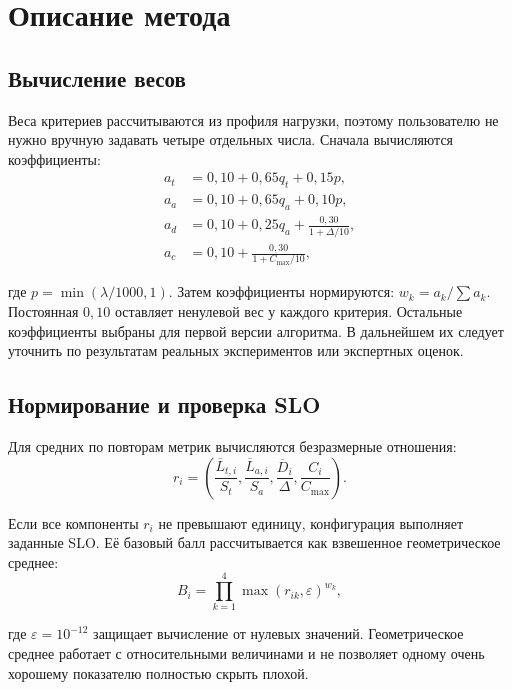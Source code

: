 \documentclass{misisarticle}
\begin{document}
\section{Описание метода}

\subsection{\textnormal{Вычисление весов}}

	Веса критериев рассчитываются из профиля нагрузки, поэтому пользователю не нужно вручную задавать четыре отдельных числа. Сначала вычисляются коэффициенты:
\begin{align}
 a_t &= 0{,}10+0{,}65q_t+0{,}15p,\\
 a_a &= 0{,}10+0{,}65q_a+0{,}10p,\\
 a_d &= 0{,}10+0{,}25q_a+\frac{0{,}30}{1+\Delta/10},\\
 a_c &= 0{,}10+\frac{0{,}30}{1+C_{\max}/10},
 \label{eq:rawweights}
\end{align}

	где $p=\min(\lambda/1000,1)$. Затем коэффициенты нормируются: $w_k=a_k/\sum a_k$. Постоянная $0{,}10$ оставляет ненулевой вес у каждого критерия. Остальные коэффициенты выбраны для первой версии алгоритма. В дальнейшем их следует уточнить по результатам реальных экспериментов или экспертных оценок.

\subsection{\textnormal{Нормирование и проверка SLO}}

	Для средних по повторам метрик вычисляются безразмерные отношения:
\begin{equation}
 r_i=\left(\frac{\overline L_{t,i}}{S_t},
 \frac{\overline L_{a,i}}{S_a},
 \frac{\overline D_i}{\Delta},
 \frac{C_i}{C_{\max}}\right).
 \label{eq:ratios}
\end{equation}

	Если все компоненты $r_i$ не превышают единицу, конфигурация выполняет заданные SLO. Её базовый балл рассчитывается как взвешенное геометрическое среднее:
\begin{equation}
 B_i=\prod_{k=1}^{4}\max(r_{ik},\varepsilon)^{w_k},
 \label{eq:base}
\end{equation}

	где $\varepsilon=10^{-12}$ защищает вычисление от нулевых значений. Геометрическое среднее работает с относительными величинами и не позволяет одному очень хорошему показателю полностью скрыть плохой.
\end{document}
